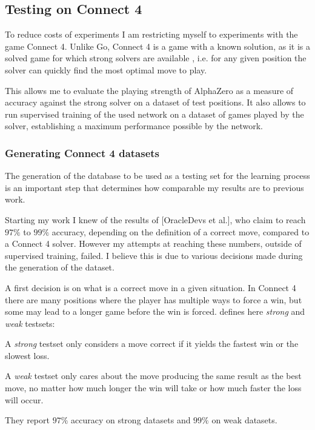 \documentclass[12pt,onecolumn,oneside,titlepage]{article}
\begin{document}
\subsection{Testing on Connect 4}

To reduce costs of experiments I am restricting myself to experiments with the game Connect 4. Unlike Go, Connect 4 is a game with a known solution, as it is a solved game for which strong solvers are available \cite{trompsolved, pascalsolver, pascalsolvergithub}, 
i.e. for any given position the solver can quickly find the most optimal move to play.

This allows me to evaluate the playing strength of AlphaZero as a measure of accuracy against the strong solver on a dataset of test positions.
It also allows to run supervised training of the used network on a dataset of games played by the solver, establishing a maximum performance possible by the network.

\subsubsection{Generating Connect 4 datasets}
\label{s:generate_dataset}

The generation of the database to be used as a testing set for the learning process is an important step that determines how comparable my results are to previous work. 

Starting my work I knew of the results of \cite{oracledevs}[OracleDevs et al.],
who claim to reach $97\%$ to $99\%$ accuracy, depending on the definition of a correct move, compared to a Connect 4 solver. However my attempts at reaching these numbers, outside of supervised training, failed. I believe this is due to various decisions made during the generation of the dataset.

A first decision is on what is a correct move in a given situation. In Connect 4 there are many positions where the player has multiple ways to force a win, but some may lead to a longer game before the win is forced.
\cite{oracledevs} defines here \emph{strong} and \emph{weak} testsets: 

A \emph{strong} testset only considers a move correct if it yields the fastest win or the slowest loss. 

A \emph{weak} testset only cares about the move producing the same result 
as the best move, no matter how much longer the win will take or how much faster the loss will occur.

They report $97\%$ accuracy on strong datasets and $99\%$ on weak datasets.
\end{document}
